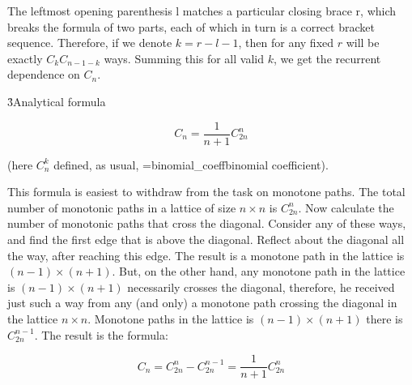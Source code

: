 The leftmost opening parenthesis l matches a particular closing brace r, which breaks the formula of two parts, each of which in turn is a correct bracket sequence. Therefore, if we denote $k = r-l-1$, then for any fixed $r$ will be exactly $C_k C_{n-1-k} $ ways. Summing this for all valid $k$, we get the recurrent dependence on $C_n$.

\h3{Analytical formula}

$$ C_n = \frac{1}{n+1} C_{2n}^{n} $$

(here $C_n^k$ defined, as usual, \algohref=binomial_coeff{binomial coefficient}).

This formula is easiest to withdraw from the task on monotone paths. The total number of monotonic paths in a lattice of size $n \times n$ is $C_{2n}^{n}$. Now calculate the number of monotonic paths that cross the diagonal. Consider any of these ways, and find the first edge that is above the diagonal. Reflect about the diagonal all the way, after reaching this edge. The result is a monotone path in the lattice is $(n-1) \times (n+1)$. But, on the other hand, any monotone path in the lattice is $(n-1) \times (n+1)$ necessarily crosses the diagonal, therefore, he received just such a way from any (and only) a monotone path crossing the diagonal in the lattice $n \times n$. Monotone paths in the lattice is $(n-1) \times (n+1)$ there is $C_{2n}^{n-1}$. The result is the formula:

$$ C_n = C_{2n}^{n} - C_{2n}^{n-1} = \frac{1}{n+1} C_{2n}^{n} $$